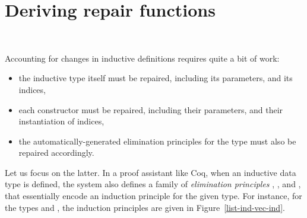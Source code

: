 \section{Deriving repair functions}~\label{deriving}

Accounting for changes in inductive definitions requires quite a bit of work:

\begin{itemize}

\item the inductive type itself must be repaired, including its parameters, and
its indices,

\item each constructor must be repaired, including their parameters, and their
instantiation of indices,

\item the automatically-generated elimination principles for the type must also
be repaired accordingly.

\end{itemize}%
%
Let us focus on the latter.  In a proof assistant like Coq, when an inductive
data type  is defined, the system also defines a family of
\textit{elimination principles} , , and
, that essentially encode an induction principle for the given
type.  For instance, for the types  and , the
induction principles are given in Figure~\ref{list-ind-vec-ind}.

